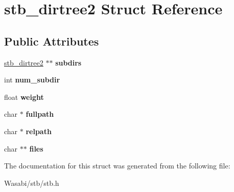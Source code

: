\hypertarget{structstb__dirtree2}{}\section{stb\+\_\+dirtree2 Struct Reference}
\label{structstb__dirtree2}
\subsection*{Public Attributes}
\begin{DoxyCompactItemize}
\item 
\hyperlink{structstb__dirtree2}{stb\+\_\+dirtree2} $\ast$$\ast$ {\bfseries subdirs}\hypertarget{structstb__dirtree2_a8a61b220ee15e03c2769c4525bb6c885}{}\label{structstb__dirtree2_a8a61b220ee15e03c2769c4525bb6c885}

\item 
int {\bfseries num\+\_\+subdir}\hypertarget{structstb__dirtree2_ab7ad776f702ca9e8bec2237511c0f1dd}{}\label{structstb__dirtree2_ab7ad776f702ca9e8bec2237511c0f1dd}

\item 
float {\bfseries weight}\hypertarget{structstb__dirtree2_ad5892c702bd4eb740110c52a0a348d80}{}\label{structstb__dirtree2_ad5892c702bd4eb740110c52a0a348d80}

\item 
char $\ast$ {\bfseries fullpath}\hypertarget{structstb__dirtree2_a11618b74091877af08c78ace84cfd47d}{}\label{structstb__dirtree2_a11618b74091877af08c78ace84cfd47d}

\item 
char $\ast$ {\bfseries relpath}\hypertarget{structstb__dirtree2_ae6b7e592877b5af149d3f373ae5cfac0}{}\label{structstb__dirtree2_ae6b7e592877b5af149d3f373ae5cfac0}

\item 
char $\ast$$\ast$ {\bfseries files}\hypertarget{structstb__dirtree2_a9207bd494bbbec51e52bbce37de24822}{}\label{structstb__dirtree2_a9207bd494bbbec51e52bbce37de24822}

\end{DoxyCompactItemize}


The documentation for this struct was generated from the following file\+:\begin{DoxyCompactItemize}
\item 
Wasabi/stb/stb.\+h\end{DoxyCompactItemize}
